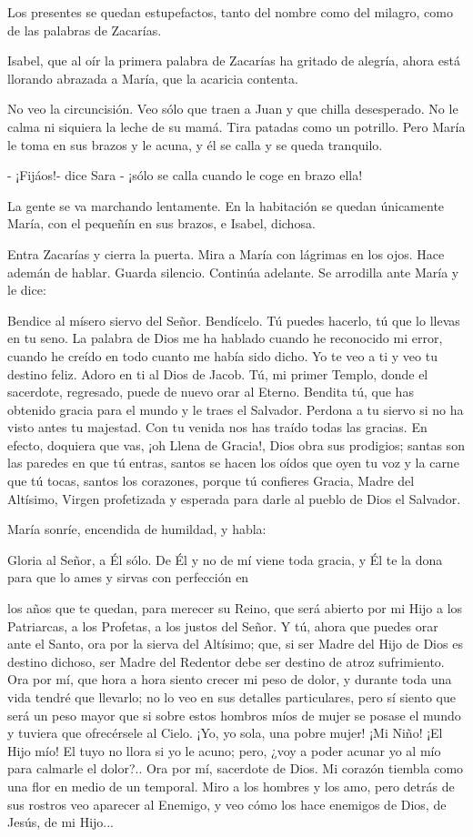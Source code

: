 \documentclass[12pt, twoside, openright]{book} %
\begin{document}
Los presentes se quedan estupefactos, tanto del nombre como del milagro, como de las palabras de Zacarías. 

Isabel, que al oír la primera palabra de Zacarías ha gritado de alegría, ahora está llorando abrazada a María, que la acaricia contenta. 

No veo la circuncisión. Veo sólo que traen a Juan y que chilla desesperado. No le calma ni siquiera la leche de su mamá. Tira patadas como un potrillo. Pero María le toma en sus brazos y le acuna, y él se calla y se queda tranquilo. 

- ¡Fijáos!- dice Sara - ¡sólo se calla cuando le coge en brazo ella! 

La gente se va marchando lentamente. En la habitación se quedan únicamente María, con el pequeñín en sus brazos, e Isabel, dichosa. 

Entra Zacarías y cierra la puerta. Mira a María con lágrimas en los ojos. Hace ademán de hablar. Guarda silencio. Continúa adelante. Se arrodilla ante María y le dice: 

Bendice al mísero siervo del Señor. Bendícelo. Tú puedes hacerlo, tú que lo llevas en tu seno. La palabra de Dios me ha hablado cuando he reconocido mi error, cuando he creído en todo cuanto me había sido dicho. Yo te veo a ti y veo tu destino feliz. Adoro en ti al Dios de Jacob. Tú, mi primer Templo, donde el sacerdote, regresado, puede de nuevo orar al Eterno. Bendita tú, que has obtenido gracia para el mundo y le traes el Salvador. Perdona a tu siervo si no ha visto antes tu majestad. Con tu venida nos has traído todas las gracias. En efecto, doquiera que vas, ¡oh Llena de Gracia!, Dios obra sus prodigios; santas son las paredes en que tú entras, santos se hacen los oídos que oyen tu voz y la carne que tú tocas, santos los corazones, porque tú confieres Gracia, Madre del Altísimo, Virgen profetizada y esperada para darle al pueblo de Dios el Salvador. 

María sonríe, encendida de humildad, y habla: 

Gloria al Señor, a Él sólo. De Él y no de mí viene toda gracia, y Él te la dona para que lo ames y sirvas con perfección en 

los años que te quedan, para merecer su Reino, que será abierto por mi Hijo a los Patriarcas, a los Profetas, a los justos del Señor. Y tú, ahora que puedes orar ante el Santo, ora por la sierva del Altísimo; que, si ser Madre del Hijo de Dios es destino dichoso, ser Madre del Redentor debe ser destino de atroz sufrimiento. Ora por mí, que hora a hora siento crecer mi peso de dolor, y durante toda una vida tendré que llevarlo; no lo veo en sus detalles particulares, pero sí siento que será un peso mayor que si sobre estos hombros míos de mujer se posase el mundo y tuviera que ofrecérsele al Cielo. ¡Yo, yo sola, una pobre mujer! ¡Mi Niño! ¡El Hijo mío! El tuyo no llora si yo le acuno; pero, ¿voy a poder acunar yo al mío para calmarle el dolor?.. Ora por mí, sacerdote de Dios. Mi corazón tiembla como una flor en medio de un temporal. Miro a los hombres y los amo, pero detrás de sus rostros veo aparecer al Enemigo, y veo cómo los hace enemigos de Dios, de Jesús, de mi Hijo... 
\end{document}
